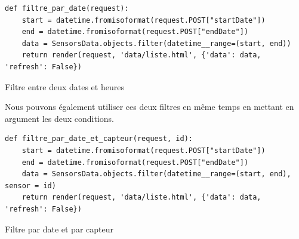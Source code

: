 \documentclass{article}
\begin{document}
\begin{listing}[H]
    \begin{verbatim}
def filtre_par_date(request):
    start = datetime.fromisoformat(request.POST["startDate"])
    end = datetime.fromisoformat(request.POST["endDate"])
    data = SensorsData.objects.filter(datetime__range=(start, end))
    return render(request, 'data/liste.html', {'data': data, 'refresh': False})
    \end{verbatim}
    \caption{Filtre entre deux dates et heures}
    \label{django:views:filtre2}
\end{listing}
Nous pouvons également utiliser ces deux filtres en même temps en mettant en argument les deux conditions.

\begin{listing}[H]
    \begin{verbatim}
def filtre_par_date_et_capteur(request, id):
    start = datetime.fromisoformat(request.POST["startDate"])
    end = datetime.fromisoformat(request.POST["endDate"])
    data = SensorsData.objects.filter(datetime__range=(start, end), sensor = id) 
    return render(request, 'data/liste.html', {'data': data, 'refresh': False})
    \end{verbatim}
    \caption{Filtre par date et par capteur}
    \label{django:views:filtre3}
\end{listing}
\end{document}
